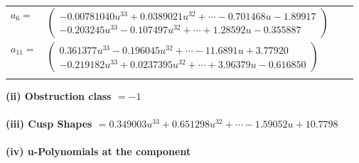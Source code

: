 \documentclass[1p]{elsarticle_modified}
\theoremstyle{definition}
\begin{document}
\begin{tabular}{m{7pt} m{180pt} m{7pt} m{180pt} }
\flushright $a_{6}=$&$\begin{pmatrix}-0.00781040 u^{33}+0.0389021 u^{32}+\cdots-0.701468 u-1.89917\\-0.203245 u^{33}-0.107497 u^{32}+\cdots+1.28592 u-0.355887\end{pmatrix}$ \\
\flushright $a_{11}=$&$\begin{pmatrix}0.361377 u^{33}-0.196045 u^{32}+\cdots-11.6891 u+3.77920\\-0.219182 u^{33}+0.0237395 u^{32}+\cdots+3.96379 u-0.616850\end{pmatrix}$\\&\end{tabular}
\flushleft \textbf{(ii) Obstruction class $= -1$}\\~\\
\flushleft \textbf{(iii) Cusp Shapes $= 0.349003 u^{33}+0.651298 u^{32}+\cdots-1.59052 u+10.7798$}\\~\\
\newpage\renewcommand{\arraystretch}{1}
\flushleft \textbf{(iv) u-Polynomials at the component}\newline \\
\end{document}
